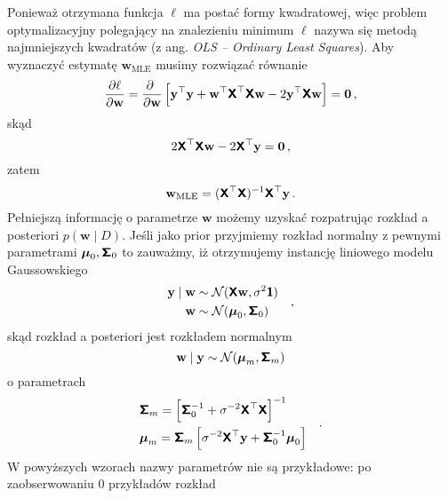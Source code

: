 \documentclass{myclass}
\begin{document}
Ponieważ otrzymana funkcja \(\ell\) ma postać formy kwadratowej, więc problem optymalizacyjny
polegający na znalezieniu minimum \(\ell\) nazywa się metodą najmniejszych kwadratów (z ang.
\textit{OLS -- Ordinary Least Squares}). Aby wyznaczyć estymatę \(\mathbf{w}_\text{MLE}\) musimy
rozwiązać równanie
\begin{equation*}
    \pdv{\ell}{\mathbf{w}} = \pdv{~}{\mathbf{w}}\left[\mathbf{y}^\top\mathbf{y} + \mathbf{w}^\top\boldsymbol{\mathsf{X}}^\top\boldsymbol{\mathsf{X}}\mathbf{w} - 2\mathbf{y}^\top\boldsymbol{\mathsf{X}}\mathbf{w}\right] = \mathbf{0}\,,
\end{equation*}
skąd
\begin{equation*}
    2\boldsymbol{\mathsf{X}}^\top\boldsymbol{\mathsf{X}}\mathbf{w} - 2\boldsymbol{\mathsf{X}}^\top\mathbf{y} = \mathbf{0}\,,
\end{equation*}
zatem
\begin{equation*}
    \mathbf{w}_\text{MLE} = (\boldsymbol{\mathsf{X}}^\top\boldsymbol{\mathsf{X}})^{-1}\boldsymbol{\mathsf{X}}^\top\mathbf{y}\,.
\end{equation*}
Pełniejszą informację o parametrze \(\mathbf{w}\) możemy uzyskać rozpatrując rozkład a posteriori
\(p(\mathbf{w} \mid D)\). Jeśli jako prior przyjmiemy rozkład normalny z pewnymi parametrami
\(\boldsymbol{\mu}_0, \boldsymbol{\mathsf{\Sigma}}_0\) to zauważmy, iż otrzymujemy instancję liniowego modelu
Gaussowskiego
\begin{equation*}
    \begin{split}
        \mathbf{y} \mid \mathbf{w} &\sim \mathcal{N}(\boldsymbol{\mathsf{X}}\mathbf{w}, \sigma^2\boldsymbol{\mathsf{1}})\\
        \mathbf{w} &\sim \mathcal{N}(\boldsymbol{\mu}_0, \boldsymbol{\mathsf{\Sigma}}_0)
    \end{split}\quad,
\end{equation*}
skąd rozkład a posteriori jest rozkładem normalnym
\begin{equation*}
    \mathbf{w} \mid \mathbf{y} \sim \mathcal{N}(\boldsymbol{\mu}_m, \boldsymbol{\mathsf{\Sigma}}_m)
\end{equation*}
o parametrach
\begin{equation*}
    \begin{split}
        &\boldsymbol{\mathsf{\Sigma}}_m = \left[\boldsymbol{\mathsf{\Sigma}}_0^{-1} + \sigma^{-2}\boldsymbol{\mathsf{X}}^\top\boldsymbol{\mathsf{X}}\right]^{-1}\\
        &\boldsymbol{\mu}_m = \boldsymbol{\mathsf{\Sigma}}_m\left[\sigma^{-2}\boldsymbol{\mathsf{X}}^\top\mathbf{y} + \boldsymbol{\mathsf{\Sigma}}_0^{-1}\boldsymbol{\mu}_0\right]    
    \end{split}\quad.
\end{equation*}
W powyższych wzorach nazwy parametrów nie są przykładowe: po zaobserwowaniu 0 przykładów rozkład
\end{document}
